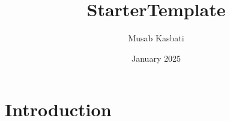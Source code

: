 \documentclass{article}
\title{StarterTemplate}
\author{Musab Kasbati}
\date{January 2025}
\begin{document}
\maketitle

\section{Introduction}
\end{document}
